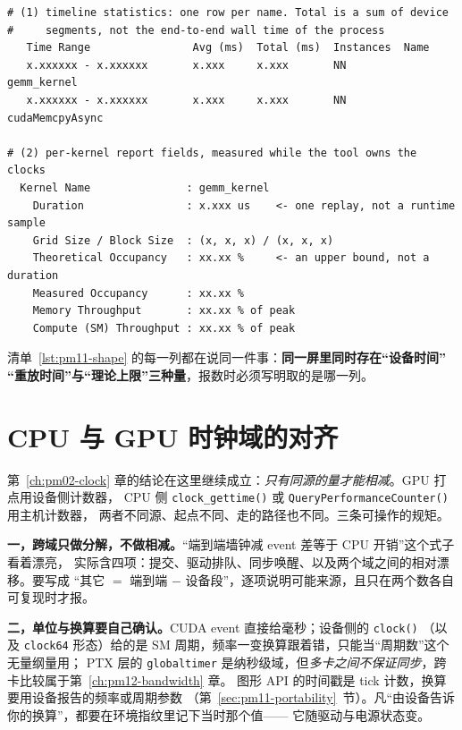 \documentclass[12pt,a4paper,fontset=fandol]{ctexbook}
\newcommand{\Fn}[1]{\texttt{#1()}}
\newcommand{\Tp}[1]{\texttt{#1}}
\newcommand{\Bk}{\discretionary{}{}{}}
\begin{document}
\begin{lstlisting}[style=outstyle, caption={形态示意：时间线统计与逐 kernel 报告的字段布局（非本仓库实测值；数值全部写成占位，只表示列的形状与单位）}, label={lst:pm11-shape}]
# (1) timeline statistics: one row per name. Total is a sum of device
#     segments, not the end-to-end wall time of the process
   Time Range                Avg (ms)  Total (ms)  Instances  Name
   x.xxxxxx - x.xxxxxx       x.xxx     x.xxx       NN         gemm_kernel
   x.xxxxxx - x.xxxxxx       x.xxx     x.xxx       NN         cudaMemcpyAsync

# (2) per-kernel report fields, measured while the tool owns the clocks
  Kernel Name               : gemm_kernel
    Duration                : x.xxx us    <- one replay, not a runtime sample
    Grid Size / Block Size  : (x, x, x) / (x, x, x)
    Theoretical Occupancy   : xx.xx %     <- an upper bound, not a duration
    Measured Occupancy      : xx.xx %
    Memory Throughput       : xx.xx % of peak
    Compute (SM) Throughput : xx.xx % of peak
\end{lstlisting}

清单~\ref{lst:pm11-shape} 的每一列都在说同一件事：\textbf{同一屏里同时存在``设备时间''
``重放时间''与``理论上限''三种量}，报数时必须写明取的是哪一列。

\section{CPU 与 GPU 时钟域的对齐}
\label{sec:pm11-domain}

第~\ref{ch:pm02-clock} 章的结论在这里继续成立：\emph{只有同源的量才能相减}。GPU 打点用设备侧计数器，
CPU 侧 \Fn{clock{\Bk}\_gettime} 或 \Fn{Query{\Bk}Performance{\Bk}Counter} 用主机计数器，
两者不同源、起点不同、走的路径也不同。三条可操作的规矩。

\textbf{一，跨域只做分解，不做相减。}``端到端墙钟减 event 差等于 CPU 开销''这个式子看着漂亮，
实际含四项：提交、驱动排队、同步唤醒、以及两个域之间的相对漂移。要写成
``其它 $=$ 端到端 $-$ 设备段''，逐项说明可能来源，且只在两个数各自可复现时才报。

\textbf{二，单位与换算要自己确认。}CUDA event 直接给毫秒；设备侧的 \Fn{clock}
（以及 \Tp{clock64} 形态）给的是 SM 周期，频率一变换算跟着错，只能当``周期数''这个无量纲量用；
PTX 层的 \Tp{globaltimer} 是纳秒级域，但\emph{多卡之间不保证同步}，跨卡比较属于第~\ref{ch:pm12-bandwidth} 章。
图形 API 的时间戳是 tick 计数，换算要用设备报告的频率或周期参数
（第~\ref{sec:pm11-portability}~节）。凡``由设备告诉你的换算''，都要在环境指纹里记下当时那个值——
它随驱动与电源状态变。
\end{document}
